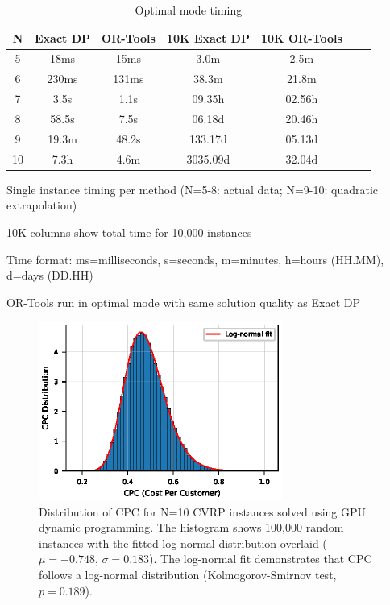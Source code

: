 \documentclass[a4paper,twoside]{article}
\begin{document}
\begin{table}[htbp]
\centering
\caption{Optimal mode timing}
\label{tab:timing-comparison}
\small
\begin{tabular}{@{}c c c c c c c@{}}
\toprule
\textbf{N} & \textbf{Exact DP} & \textbf{OR-Tools} & \textbf{10K Exact DP} & \textbf{10K OR-Tools} \\
\midrule
5 & 18ms  & 15ms  & 3.0m   & 2.5m \\
6 & 230ms & 131ms & 38.3m  & 21.8m \\
7 & 3.5s  & 1.1s  & 09.35h & 02.56h \\
8 & 58.5s & 7.5s  & 06.18d & 20.46h \\
\midrule
9 & 19.3m & 48.2s & 133.17d  & 05.13d \\
10 & 7.3h & 4.6m  & 3035.09d & 32.04d \\
\bottomrule
\end{tabular}
\begin{tablenotes}
\small
\item Single instance timing per method (N=5-8: actual data; N=9-10: quadratic extrapolation)
\item 10K columns show total time for 10,000 instances
\item Time format: ms=milliseconds, s=seconds, m=minutes, h=hours (HH.MM), d=days (DD.HH)
\item OR-Tools run in optimal mode with same solution quality as Exact DP
\end{tablenotes}
\end{table}


\begin{figure}[t!]
\centering
   \includegraphics[width=80mm]{figures/cpc_histogram_paper_100k.eps}
   \caption{Distribution of CPC for N=10 CVRP instances solved using GPU dynamic programming. The histogram shows 100,000 random instances with the fitted log-normal distribution overlaid ($\mu=-0.748$, $\sigma=0.183$). The log-normal fit demonstrates that CPC follows a log-normal distribution (Kolmogorov-Smirnov test, $p=0.189$).}
\label{fig:cpc_histogram}
\end{figure}
\end{document}
